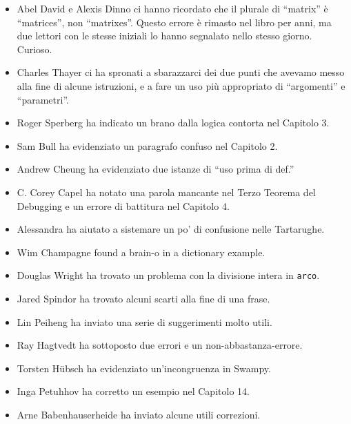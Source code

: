 \documentclass[10pt]{book}
\begin{document}
\begin{itemize}
\item Abel David e Alexis Dinno ci hanno ricordato che il plurale di
``matrix'' è ``matrices'', non ``matrixes''.  Questo errore è rimasto nel libro per anni, ma due lettori con le stesse iniziali lo hanno segnalato nello stesso giorno. Curioso.

\item Charles Thayer ci ha spronati a sbarazzarci dei due punti che avevamo messo alla fine di alcune istruzioni, e a fare un uso più appropriato di ``argomenti'' e ``parametri''.

\item Roger Sperberg ha indicato un brano dalla logica contorta nel Capitolo 3.

\item Sam Bull ha evidenziato un paragrafo confuso nel Capitolo 2.

\item Andrew Cheung ha evidenziato due istanze di ``uso prima di def.''

\item C. Corey Capel ha notato una parola mancante nel Terzo Teorema del Debugging e un errore di battitura nel Capitolo 4.

\item Alessandra ha aiutato a sistemare un po' di confusione nelle Tartarughe.

\item Wim Champagne found a brain-o in a dictionary example.

\item Douglas Wright ha trovato un problema con la divisione intera in
{\tt arco}.

\item Jared Spindor ha trovato alcuni scarti alla fine di una frase.

\item Lin Peiheng ha inviato una serie di suggerimenti molto utili.

\item Ray Hagtvedt ha sottoposto due errori e un non-abbastanza-errore.

\item Torsten H\"{u}bsch ha evidenziato un'incongruenza in Swampy.

\item Inga Petuhhov ha corretto un esempio nel Capitolo 14.

\item Arne Babenhauserheide ha inviato alcune utili correzioni.


\end{itemize}
\end{document}
